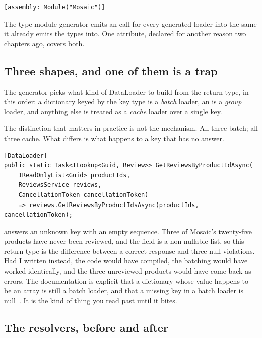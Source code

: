 \begin{verbatim}
[assembly: Module("Mosaic")]
\end{verbatim}

The type module generator emits an  call for every generated
loader into the same  it already emits the types into. One
attribute, declared for another reason two chapters ago, covers both.

\subsection*{Three shapes, and one of them is a trap}

%
The generator picks what kind of DataLoader to build from the return type, in
this order: a dictionary keyed by the key type is a \emph{batch} loader, an
 is a \emph{group} loader, and anything else is treated as a
\emph{cache} loader over a single key.

The distinction that matters in practice is not the mechanism. All three batch;
all three cache. What differs is what happens to a key that has no answer.

\begin{verbatim}
[DataLoader]
public static Task<ILookup<Guid, Review>> GetReviewsByProductIdAsync(
    IReadOnlyList<Guid> productIds,
    ReviewsService reviews,
    CancellationToken cancellationToken)
    => reviews.GetReviewsByProductIdsAsync(productIds, cancellationToken);
\end{verbatim}

 answers an unknown key with an empty sequence. Three of Mosaic's
twenty-five products have never been reviewed, and the  field is a
non-nullable list, so this return type is the difference between a correct
response and three null violations. Had I written
 instead, the code would have compiled, the
batching would have worked identically, and the three unreviewed products would
have come back as errors. The documentation is explicit that a dictionary whose
value happens to be an array is still a batch loader, and that a missing key in
a batch loader is null~\autocite{chillicream2026dataloaderdocs}. It is the kind
of thing you read past until it bites.

\subsection*{The resolvers, before and after}

